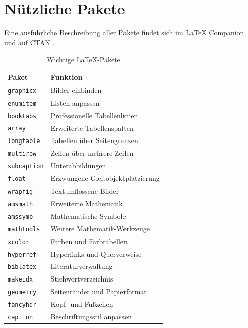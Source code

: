 \chapter{Nützliche Pakete}
\label{anhang:pakete}

Eine ausführliche Beschreibung aller Pakete findet sich im \LaTeX{} Companion \cite{mittelbach2004} und auf CTAN \cite{ctan2024}.

\begin{table}[htbp]
    \centering
    \caption{Wichtige \LaTeX-Pakete}
    \label{tab:pakete}
    \begin{tabular}{lp{6cm}}
        \toprule
        Paket & Funktion \\
        \midrule
        \texttt{graphicx} & Bilder einbinden \\
        \texttt{enumitem} & Listen anpassen \\
        \texttt{booktabs} & Professionelle Tabellenlinien \\
        \texttt{array}     & Erweiterte Tabellenspalten \\
        \texttt{longtable} & Tabellen über Seitengrenzen \\
        \texttt{multirow}  & Zellen über mehrere Zeilen \\
        \texttt{subcaption} & Unterabbildungen \\
        \texttt{float}     & Erzwungene Gleitobjektplatzierung \\
        \texttt{wrapfig}   & Textumflossene Bilder \\
        \texttt{amsmath}   & Erweiterte Mathematik \\
        \texttt{amssymb}   & Mathematische Symbole \\
        \texttt{mathtools} & Weitere Mathematik-Werkzeuge \\
        \texttt{xcolor}    & Farben und Farbtabellen \\
        \texttt{hyperref}  & Hyperlinks und Querverweise \\
        \texttt{biblatex}  & Literaturverwaltung \\
        \texttt{makeidx}   & Stichwortverzeichnis \\
        \texttt{geometry}  & Seitenränder und Papierformat \\
        \texttt{fancyhdr}  & Kopf- und Fußzeilen \\
        \texttt{caption}   & Beschriftungsstil anpassen \\
        \bottomrule
    \end{tabular}
\end{table}